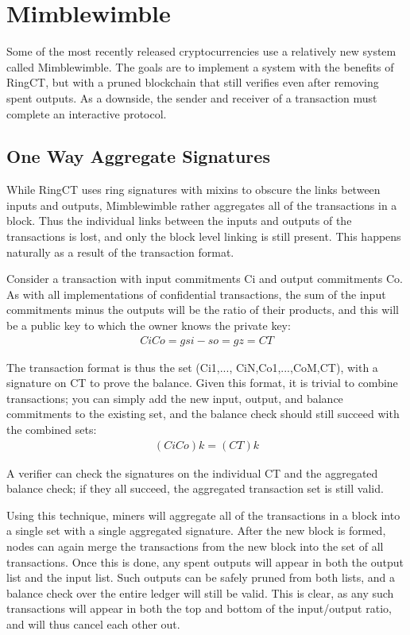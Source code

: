 \documentclass{article}
\begin{document}
\section{Mimblewimble}

Some of the most recently released cryptocurrencies use a relatively new system called Mimblewimble.  The goals are to implement a system with the benefits of RingCT, but with a pruned blockchain that still verifies even after removing spent outputs.  As a downside, the sender and receiver of a transaction must complete an interactive protocol.


\subsection{One Way Aggregate Signatures}

While RingCT uses ring signatures with mixins to obscure the links between inputs and outputs, Mimblewimble rather aggregates all of the transactions in a block.  Thus the individual links between the inputs and outputs of the transactions is lost, and only the block level linking is still present.  This happens naturally as a result of the transaction format.

Consider a transaction with input commitments Ci and output commitments Co.  As with all implementations of confidential transactions, the sum of the input commitments minus the outputs will be the ratio of their products, and this will be a public key to which the owner knows the private key:
\begin{eqnarray}
  Ci Co=g si -  so=gz=CT
\end{eqnarray}

The transaction format is thus the set (Ci1,..., CiN,Co1,...,CoM,CT), with a signature on CT to prove the balance.  Given this format, it is trivial to combine transactions; you can simply add the new input, output, and balance commitments to the existing set, and the balance check should still succeed with the combined sets:
\begin{eqnarray}
  (  Ci Co)k= (CT)k
\end{eqnarray}

A verifier can check the signatures on the individual CT and the aggregated balance check; if they all succeed, the aggregated transaction set is still valid.

Using this technique, miners will aggregate all of the transactions in a block into a single set with a single aggregated signature.  After the new block is formed, nodes can again merge the transactions from the new block into the set of all transactions.  Once this is done, any spent outputs will appear in both the output list and the input list.  Such outputs can be safely pruned from both lists, and a balance check over the entire ledger will still be valid.  This is clear, as any such transactions will appear in both the top and bottom of the input/output ratio, and will thus cancel each other out.  
\end{document}
